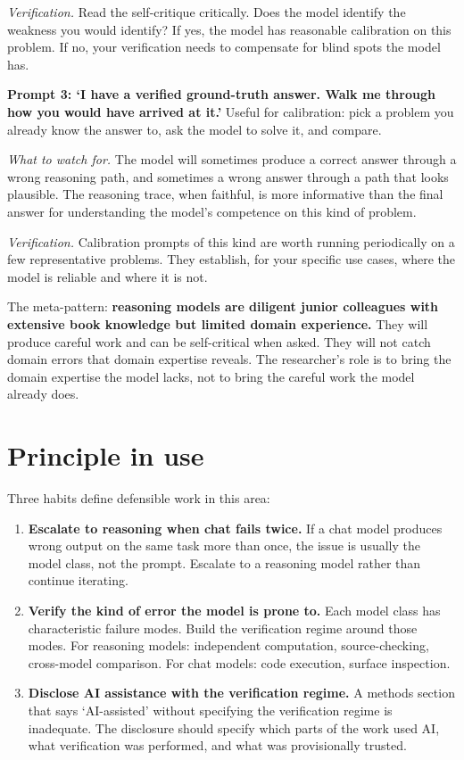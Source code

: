 \documentclass[
  letterpaper,
  11pt]{scrbook}
\begin{document}
\emph{Verification.} Read the self-critique critically. Does the model
identify the weakness you would identify? If yes, the model has
reasonable calibration on this problem. If no, your verification needs
to compensate for blind spots the model has.

\textbf{Prompt 3: `I have a verified ground-truth answer. Walk me
through how you would have arrived at it.'} Useful for calibration: pick
a problem you already know the answer to, ask the model to solve it, and
compare.

\emph{What to watch for.} The model will sometimes produce a correct
answer through a wrong reasoning path, and sometimes a wrong answer
through a path that looks plausible. The reasoning trace, when faithful,
is more informative than the final answer for understanding the model's
competence on this kind of problem.

\emph{Verification.} Calibration prompts of this kind are worth running
periodically on a few representative problems. They establish, for your
specific use cases, where the model is reliable and where it is not.

The meta-pattern: \textbf{reasoning models are diligent junior
colleagues with extensive book knowledge but limited domain experience.}
They will produce careful work and can be self-critical when asked. They
will not catch domain errors that domain expertise reveals. The
researcher's role is to bring the domain expertise the model lacks, not
to bring the careful work the model already does.

\section{Principle in use}\label{principle-in-use-2}

Three habits define defensible work in this area:

\begin{enumerate}
\def\labelenumi{\arabic{enumi}.}
\item
  \textbf{Escalate to reasoning when chat fails twice.} If a chat model
  produces wrong output on the same task more than once, the issue is
  usually the model class, not the prompt. Escalate to a reasoning model
  rather than continue iterating.
\item
  \textbf{Verify the kind of error the model is prone to.} Each model
  class has characteristic failure modes. Build the verification regime
  around those modes. For reasoning models: independent computation,
  source-checking, cross-model comparison. For chat models: code
  execution, surface inspection.
\item
  \textbf{Disclose AI assistance with the verification regime.} A
  methods section that says `AI-assisted' without specifying the
  verification regime is inadequate. The disclosure should specify which
  parts of the work used AI, what verification was performed, and what
  was provisionally trusted.
\end{enumerate}
\end{document}
